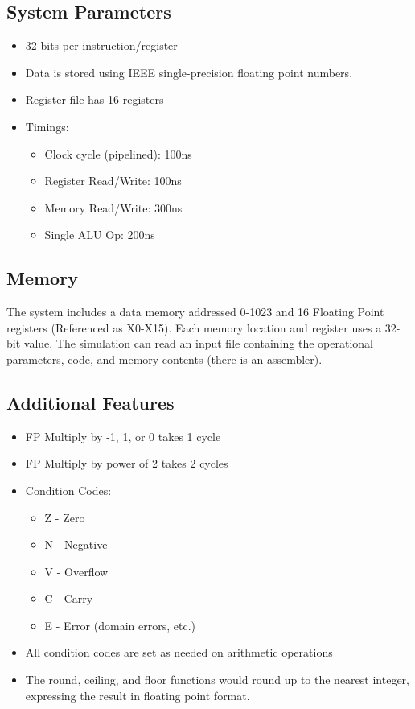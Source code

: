 \documentclass[a4paper,14pt]{article}
\begin{document}
\subsection{System Parameters}
\begin{itemize}
    \setlength{\parskip}{0pt}
    \setlength{\itemsep}{0pt plus 1pt}
    \item 32 bits per instruction/register
    \item Data is stored using IEEE single-precision floating point numbers.
    \item Register file has 16 registers
    \item Timings:
    \begin{itemize}
        \setlength{\parskip}{0pt}
        \item Clock cycle (pipelined): 100ns
        \item Register Read/Write: 100ns
        \item Memory Read/Write: 300ns
        \item Single ALU Op: 200ns
    \end{itemize}
\end{itemize}

\subsection{Memory}
The system includes a data memory addressed 0-1023 and 16 Floating Point registers (Referenced as X0-X15). Each memory location and register uses a 32-bit value. The simulation can read an input file containing the operational parameters, code, and memory contents (there is an assembler).
\subsection{Additional Features}
\begin{itemize}
    \setlength{\parskip}{0pt}
    \setlength{\itemsep}{0pt plus 1pt}
    \item FP Multiply by -1, 1, or 0 takes 1 cycle
    \item FP Multiply by power of 2 takes 2 cycles
    \item Condition Codes:
    \begin{itemize}
        \setlength{\parskip}{0pt}
        \setlength{\itemsep}{0pt plus 1pt}
        \item Z - Zero
        \item N - Negative
        \item V - Overflow
        \item C - Carry
        \item E - Error (domain errors, etc.)
    \end{itemize}
    \item All condition codes are set as needed on arithmetic operations
    \item The round, ceiling, and floor functions would round up to the nearest integer, expressing the result in floating point format.
\end{itemize}
\end{document}
